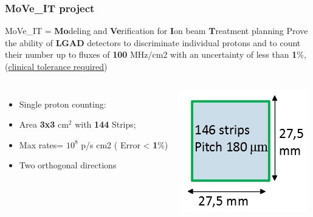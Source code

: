 \documentclass[aspectratio=169]{beamer}
\begin{document}
	\begin{frame}
	\frametitle{MoVe\_IT project}
	\begin{center}
		{\Large \color{blue} MoVe\_IT = \textbf{Mo}deling and \textbf{Ve}rification for \textbf{I}on beam \textbf{T}reatment planning }
		\newline
		Prove the ability of \textbf{LGAD} detectors to discriminate individual protons and to count their number up to fluxes of \textbf{100} MHz/cm2 with an uncertainty of {\color{blue}less than \textbf{1}\%}, (\underline{clinical tolerance required})
	\end{center}
	\begin{columns}
		\begin{itemize}
			\item Single proton counting:
			\item Area \textbf{3x3} cm${}^2$ with \textbf{144} Strips;
			\item Max rates= $10^8$ p/s cm2 ({\color{blue} Error < \textbf{1}\%})
			\item Two orthogonal directions
		\end{itemize}
		\begin{center}
			\includegraphics[width=0.7 \textwidth]{IMG/Detector.PNG}
		\end{center}
	\end{columns}
	\end{frame}
\end{document}
